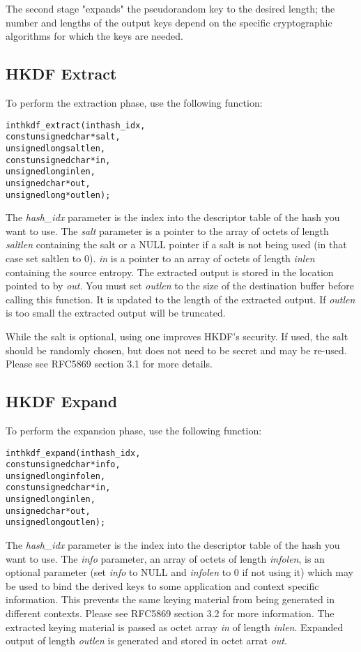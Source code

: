 \documentclass[synpaper]{book}
\begin{document}
The second stage "expands" the pseudorandom key to the desired length; the number and lengths of the output keys depend on the
specific cryptographic algorithms for which the keys are needed.

\subsection{HKDF Extract}
To perform the extraction phase, use the following function:

\begin{alltt}
int hkdf_extract(   int  hash_idx,
    const unsigned char *salt,
          unsigned long  saltlen,
    const unsigned char *in,
          unsigned long  inlen,
          unsigned char *out,
          unsigned long *outlen);
\end{alltt}
The \textit{hash\_idx} parameter is the index into the descriptor table of the hash you want to use.
The \textit{salt} parameter is a pointer to the array of octets of length \textit{saltlen} containing the salt or a NULL pointer if a salt is not being used (in that case set saltlen to 0).
\textit{in} is a pointer to an array of octets of length \textit{inlen} containing the source entropy.  The extracted output is stored in the location pointed to by \textit{out}.
You must set \textit{outlen} to the size of the destination buffer before calling this function. It is updated to the length of the extracted output. If \textit{outlen} is too small the extracted output will be truncated.

While the salt is optional, using one improves HKDF's security. If used, the salt should be randomly chosen, but does not need to be secret and may be re-used. Please see RFC5869 section 3.1 for more details.

\subsection{HKDF Expand}
To perform the expansion phase, use the following function:

\begin{alltt}
int hkdf_expand(    int  hash_idx,
    const unsigned char *info,
          unsigned long  infolen,
    const unsigned char *in,
          unsigned long  inlen,
          unsigned char *out,
          unsigned long  outlen);
\end{alltt}

The \textit{hash\_idx} parameter is the index into the descriptor table of the hash you want to use.
The \textit{info} parameter, an array of octets of length \textit{infolen}, is an optional parameter (set \textit{info} to NULL and \textit{infolen} to 0 if not using it) which
may be used to bind the derived keys to some application and context specific information. This prevents the same keying material from being generated in different contexts. Please see RFC5869 section 3.2 for more information.
The extracted keying material is passed as octet array \textit{in} of length \textit{inlen}.  Expanded output of length \textit{outlen} is generated and stored in octet arrat \textit{out}.
\end{document}
